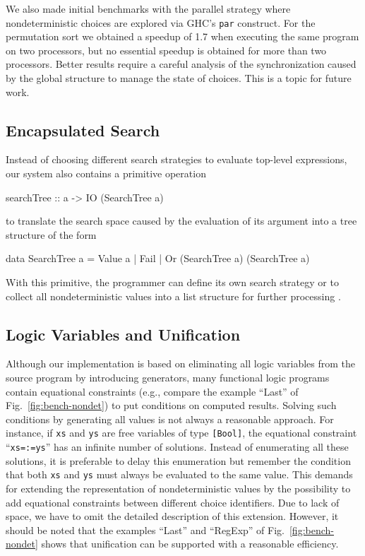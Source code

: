 \documentclass{llncs}
\newcommand{\code}[1]{\mbox{\small\texttt{#1}}}
\newcommand{\ccode}[1]{``\code{#1}''}
\begin{document}
We also made initial benchmarks with the parallel strategy
where nondeterministic choices are explored via GHC's \code{par}
construct. For the permutation sort we obtained a speedup of 1.7
when executing the same program on two processors, but no essential
speedup is obtained for more than two processors.
Better results require a careful analysis of the synchronization
caused by the global structure to manage the state of choices.
This is a topic for future work.

\subsection{Encapsulated Search}

Instead of choosing different search strategies to evaluate
top-level expressions, our system also contains a primitive operation
\begin{curry}
 searchTree :: a -> IO (SearchTree a)
\end{curry}
to translate the search space caused by the evaluation of its argument
into a tree structure of the form
\begin{curry}
 data SearchTree a = Value a | Fail | Or (SearchTree a) (SearchTree a)
\end{curry}
With this primitive,
the programmer can define its own search strategy or to
collect all nondeterministic values into a list structure
for further processing \cite{BrasselHuch07}.


\subsection{Logic Variables and Unification}
\label{sec:unification}

Although our implementation is based on eliminating all logic
variables from the source program by introducing generators,
many functional logic programs contain equational constraints
(e.g., compare the example ``Last'' of Fig.~\ref{fig:bench-nondet})
to put conditions on computed results.
Solving such conditions by generating all values is not always
a reasonable approach. For instance, if \code{xs} and \code{ys}
are free variables of type \code{[Bool]}, the equational
constraint \ccode{xs=:=ys} has an infinite number of solutions.
Instead of enumerating all these solutions, it is preferable to
delay this enumeration but remember the condition that both
\code{xs} and \code{ys} must always be evaluated to the same value.
This demands for extending the representation of nondeterministic
values by the possibility to add equational constraints between
different choice identifiers.
Due to lack of space, we have to omit the detailed description
of this extension.
However, it should be noted that the examples
``Last'' and ``RegExp'' of Fig.~\ref{fig:bench-nondet}
shows that unification can be supported with a reasonable efficiency.
\end{document}
